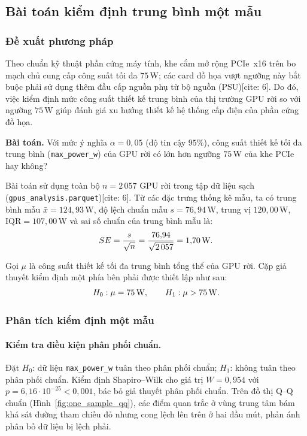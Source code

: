 \subsection{Bài toán kiểm định trung bình một mẫu}

\subsubsection{Đề xuất phương pháp}

Theo chuẩn kỹ thuật phần cứng máy tính, khe cắm mở rộng PCIe~x16 trên bo mạch chủ cung cấp công suất tối đa $75$\,W; các card đồ họa vượt ngưỡng này bắt buộc phải sử dụng thêm đầu cấp nguồn phụ từ bộ nguồn (PSU)[cite: 6]. Do đó, việc kiểm định mức công suất thiết kế trung bình của thị trường GPU rời so với ngưỡng $75$\,W giúp đánh giá xu hướng thiết kế hệ thống cấp điện của phần cứng đồ họa.

\textbf{Bài toán.} Với mức ý nghĩa $\alpha = 0{,}05$ (độ tin cậy $95\%$), công suất thiết kế tối đa trung bình (\texttt{max\_power\_w}) của GPU rời có lớn hơn ngưỡng $75$\,W của khe PCIe hay không?

Bài toán sử dụng toàn bộ $n = 2\,057$ GPU rời trong tập dữ liệu sạch (\texttt{gpus\_\allowbreak{}analysis.parquet})[cite: 6]. Từ các đặc trưng thống kê mẫu, ta có trung bình mẫu $\bar{x} = 124{,}93$\,W, độ lệch chuẩn mẫu $s = 76{,}94$\,W, trung vị $120{,}00$\,W, $\text{IQR} = 107{,}00$\,W và sai số chuẩn của trung bình mẫu là:
\[
  SE = \frac{s}{\sqrt{n}} = \frac{76{,}94}{\sqrt{2\,057}} = 1{,}70\text{\,W}.
\]

Gọi $\mu$ là công suất thiết kế tối đa trung bình tổng thể của GPU rời. Cặp giả thuyết kiểm định một phía bên phải được thiết lập như sau:
\[
  H_0: \mu = 75\text{\,W}, \qquad H_1: \mu > 75\text{\,W}.
\]

\subsubsection{Phân tích kiểm định một mẫu}

\paragraph{Kiểm tra điều kiện phân phối chuẩn.}
Đặt $H_0$: dữ liệu \texttt{max\_power\_w} tuân theo phân phối chuẩn; $H_1$: không tuân theo phân phối chuẩn. Kiểm định Shapiro--Wilk cho giá trị $W = 0{,}954$ với $p = 6{,}16 \cdot 10^{-25} < 0{,}001$, bác bỏ giả thuyết phân phối chuẩn. Trên đồ thị Q--Q chuẩn (Hình~\ref{fig:one_sample_qq}), các điểm quan trắc ở vùng trung tâm bám khá sát đường tham chiếu đỏ nhưng cong lệch lên trên ở hai đầu mút, phản ánh phân bố dữ liệu bị lệch phải.

